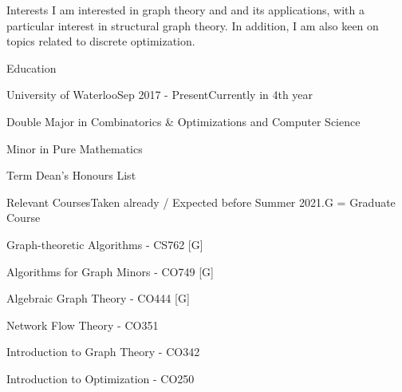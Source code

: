 \documentclass{cv}
\begin{document}
\begin{rSection}{Interests}
	I am interested in graph theory and and its applications, with a particular interest in structural graph theory. In addition, I am also keen on topics related to discrete optimization.
\end{rSection}

\begin{rSection}{Education}
\begin{rSubsection}{University of Waterloo}{Sep 2017 - Present}{Currently in 4th year}{}
	\item Double Major in Combinatorics \& Optimizations and Computer Science
	\item Minor in Pure Mathematics
	\item Term Dean's Honours List
\end{rSubsection}


\begin{rSubsection}{Relevant Courses}{}{Taken already / Expected before Summer 2021.}{G = Graduate Course}
	\item Graph-theoretic Algorithms - CS762 [G]
	\item Algorithms for Graph Minors - CO749 [G]
	\item Algebraic Graph Theory - CO444 [G]
	\item Network Flow Theory - CO351
	\item Introduction to Graph Theory - CO342
	\item Introduction to Optimization - CO250
\end{rSubsection}



\end{rSection}
\end{document}

